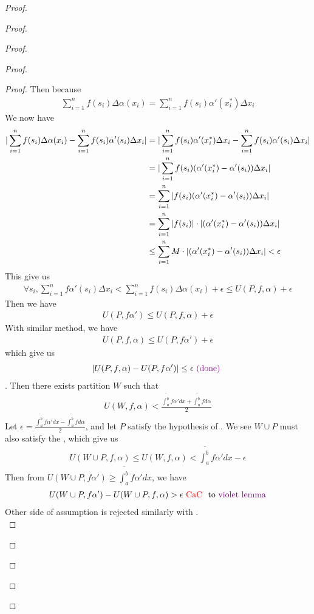 \documentclass{report}
\begin{document}
\begin{proof}
\begin{proof}
\begin{proof}
\begin{proof}
\begin{proof}
Then because 
\begin{align*}
\sum_{i=1}^n f(s_i)\Delta \alpha (x_i)= \sum_{i=1}^n f(s_i) \alpha '(x_i^*)\Delta x_i
\end{align*}
We now have 
\begin{align*}
|\sum_{i=1}^n f(s_i)\Delta \alpha (x_i)-\sum_{i=1}^n f(s_i)\alpha '(s_i)\Delta x_i|&= |\sum_{i=1}^n f(s_i)\alpha '(x_i^*)\Delta x_i -\sum_{i=1}^n f(s_i)\alpha '(s_i)\Delta x_i|\\
&=|\sum_{i=1}^n f(s_i) (\alpha '(x_i^*)-\alpha '(s_i))\Delta x_i|\\
&=\sum_{i=1}^n |f(s_i)(\alpha '(x_i^*)-\alpha '(s_i))\Delta x_i| \\
&=\sum_{i=1}^n |f(s_i)|\cdot |(\alpha '(x_i^*)-\alpha '(s_i))\Delta x_i|\\
&\leq \sum_{i=1}^n M \cdot |(\alpha '(x_i^*)-\alpha '(s_i))\Delta x_i| < \epsilon  
\end{align*}
This give us 
\begin{align*}
\forall s_i,\sum_{i=1}^n f\alpha ' (s_i)\Delta x_i< \sum_{i=1}^n f(s_i)\Delta \alpha (x_i) + \epsilon \leq U (P,f,\alpha )+\epsilon 
\end{align*}
Then we have 
\begin{align*}
U(P,f\alpha ')\leq U(P,f,\alpha )+\epsilon 
\end{align*}
With similar method, we have 
\begin{align*}
U(P,f,\alpha )\leq U(P,f\alpha ')+\epsilon 
\end{align*}
which give us 
\begin{align*}
|U(P,f,\alpha )-U(P,f\alpha ')|\leq \epsilon \textcolor{violet}{\text{ (done) }}
\end{align*}
. Then there exists partition $W$ such that 
\begin{align*}
  U(W,f,\alpha )< \frac{\overline{\int_a^b} f\alpha 'dx+\overline{\int_a^b}fd\alpha }{2}
\end{align*}
Let $\epsilon = \frac{\overline{\int_a^b}f\alpha 'dx-\overline{\int_a^b }fd\alpha }{2}$, and let $P$ satisfy the hypothesis of . We see $W\cup P$ must also satisfy the , which give us 
\begin{align*}
U(W\cup  P,f,\alpha )\leq U(W,f,\alpha )<\overline{\int_a^b}f\alpha 'dx - \epsilon 
\end{align*}
Then from $U(W\cup  P,f\alpha ')\geq \overline{\int_a^b}f\alpha 'dx$, we have 
\begin{align*}
U(W\cup  P,f\alpha ')-U(W\cup P,f,\alpha )>\epsilon \text{ \textcolor{red}{CaC} } \text{ to }\textcolor{violet}{\text{violet lemma}}
\end{align*}
Other side of assumption is rejected similarly with .\\


\end{proof}
\end{proof}
\end{proof}
\end{proof}
\end{proof}
\end{document}
